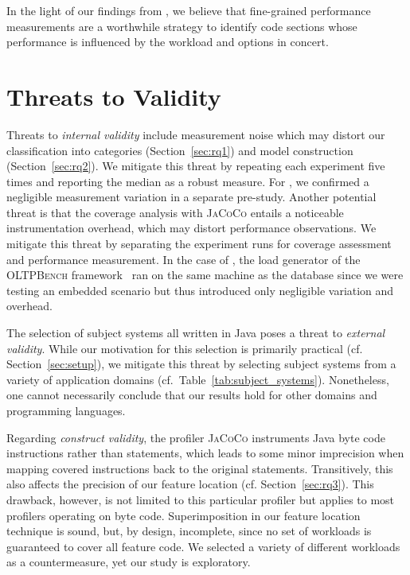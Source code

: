 {In the light of our findings from , we believe that fine-grained performance measurements are a worthwhile strategy to identify code sections whose performance is influenced by the workload and options in concert.

\section{Threats to Validity}\label{sec:threats}

Threats to \emph{internal validity} include measurement noise which may distort our classification into categories (Section~\ref{sec:rq1}) and model construction (Section~\ref{sec:rq2}). We mitigate this threat by repeating each experiment five times and reporting the median as a robust measure. For \htwo, we confirmed a negligible measurement variation in a separate pre-study.
Another potential threat is that the coverage analysis with \mbox{\textsc{JaCoCo}} entails a noticeable instrumentation overhead, which may distort performance observations. We mitigate this threat by separating the experiment runs for coverage assessment and performance measurement. In the case of \htwo, the load generator of the \textsc{OLTPBench} framework~\cite{difallah_oltp_2013} ran on the same machine as the database since we were testing an embedded scenario but thus introduced only negligible variation and overhead.

The selection of subject systems all written in Java poses a threat to \emph{external validity}. While our motivation for this selection is primarily practical (cf. Section~\ref{sec:setup}), we mitigate this threat by selecting subject systems from a variety of application domains (cf.~Table~\ref{tab:subject_systems}). Nonetheless, one cannot necessarily conclude that our results hold for other domains and programming languages. 

Regarding \emph{construct validity}, the profiler \textsc{JaCoCo} instruments Java byte code instructions rather than statements, which leads to some minor imprecision when mapping covered instructions back to the original statements. Transitively, this also affects the precision of our feature location (cf. Section~\ref{sec:rq3}). This drawback, however, is not limited to this particular profiler but applies to most profilers operating on byte code. 
Superimposition in our feature location technique is sound, but, by design, incomplete, since no set of workloads is guaranteed to cover all feature code. We selected a variety of different workloads as a countermeasure, yet our study is exploratory. 

}
